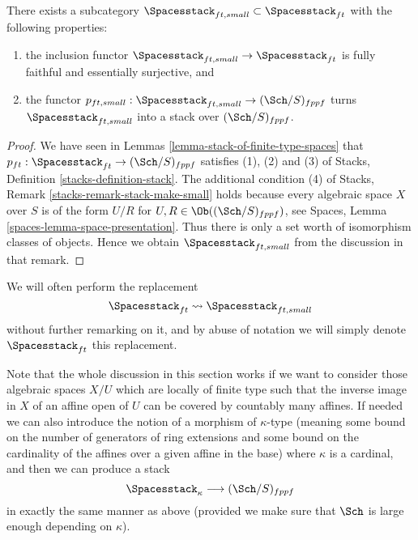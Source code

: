\begin{lemma}
\label{lemma-stack-ft-spaces}
There exists a subcategory
$\Spacesstack_{ft, small} \subset \Spacesstack_{ft}$
with the following properties:
\begin{enumerate}
\item the inclusion functor
$\Spacesstack_{ft, small} \to \Spacesstack_{ft}$ is
fully faithful and essentially surjective, and
\item the functor
$p_{ft, small} : \Spacesstack_{ft, small} \to (\Sch/S)_{fppf}$
turns $\Spacesstack_{ft, small}$ into a stack over
$(\Sch/S)_{fppf}$.
\end{enumerate}
\end{lemma}

\begin{proof}
We have seen in
Lemmas \ref{lemma-stack-of-finite-type-spaces}
that $p_{ft} : \Spacesstack_{ft} \to (\Sch/S)_{fppf}$
satisfies (1), (2) and (3) of
Stacks, Definition \ref{stacks-definition-stack}.
The additional condition (4) of
Stacks, Remark \ref{stacks-remark-stack-make-small}
holds because every algebraic space $X$ over $S$ is of the
form $U/R$ for $U, R \in \Ob((\Sch/S)_{fppf})$, see
Spaces, Lemma \ref{spaces-lemma-space-presentation}.
Thus there is only a set worth of isomorphism classes of objects.
Hence we obtain $\Spacesstack_{ft, small}$ from the discussion
in that remark.
\end{proof}

\noindent
We will often perform the replacement
$$
\Spacesstack_{ft} \leadsto \Spacesstack_{ft, small}
$$
without further remarking on it, and by abuse of notation we will
simply denote $\Spacesstack_{ft}$ this replacement.

\begin{remark}
\label{remark-higher-cardinality-spaces}
Note that the whole discussion in this section works
if we want to consider those algebraic spaces $X/U$ which are
locally of finite type such that the inverse image in $X$ of an affine open
of $U$ can be covered by countably many affines.
If needed we can also introduce the notion of a morphism of
$\kappa$-type (meaning some bound on the number of generators of
ring extensions and some bound on the cardinality of the affines over
a given affine in the base) where $\kappa$ is a cardinal, and then
we can produce a stack
$$
\Spacesstack_\kappa \longrightarrow (\Sch/S)_{fppf}
$$
in exactly the same manner as above (provided we make sure that
$\Sch$ is large enough depending on $\kappa$).
\end{remark}





